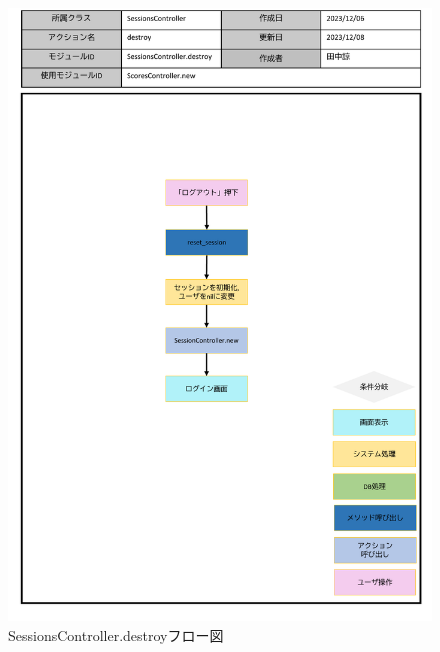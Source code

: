 \begin{figure}
    \centering
    \includegraphics[scale=0.7]{img/Sessions/pptx/SessionsController_destroy.pdf}
    \caption{SessionsController.destroyフロー図}
\end{figure}
